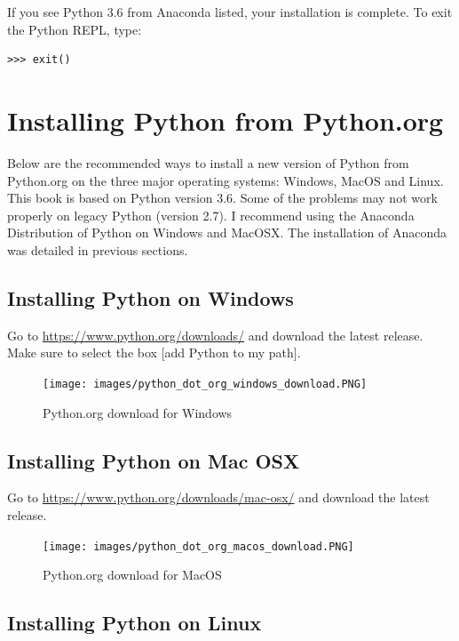 \documentclass{book}
\begin{document}
If you see Python 3.6 from Anaconda listed, your installation is
complete. To exit the Python REPL, type:

\begin{lstlisting}
>>> exit()
\end{lstlisting}

    \section{Installing Python from
Python.org}\label{installing-python-from-python.org}

    Below are the recommended ways to install a new version of Python from
Python.org on the three major operating systems: Windows, MacOS and
Linux. This book is based on Python version 3.6. Some of the problems
may not work properly on legacy Python (version 2.7). I recommend using
the Anaconda Distribution of Python on Windows and MacOSX. The
installation of Anaconda was detailed in previous sections.

    \subsection{Installing Python on
Windows}\label{installing-python-on-windows}

Go to \url{https://www.python.org/downloads/} and download the latest
release. Make sure to select the box {[}add Python to my path{]}.

\begin{figure}
\centering
\texttt{[image: images/python\_dot\_org\_windows\_download.PNG]}
\caption{Python.org download for Windows}
\end{figure}

    \subsection{Installing Python on Mac
OSX}\label{installing-python-on-mac-osx}

Go to \url{https://www.python.org/downloads/mac-osx/} and download the
latest release.

\begin{figure}
\centering
\texttt{[image: images/python\_dot\_org\_macos\_download.PNG]}
\caption{Python.org download for MacOS}
\end{figure}

    \subsection{Installing Python on
Linux}\label{installing-python-on-linux}
\end{document}
